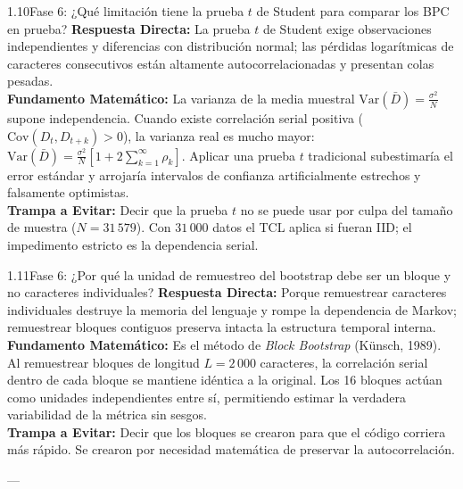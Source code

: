 \documentclass[11pt,letterpaper]{article}
\begin{document}
\begin{qbox}{1.10}{Fase 6: ¿Qué limitación tiene la prueba $t$ de Student para comparar los BPC en prueba?}
\textbf{Respuesta Directa:} La prueba $t$ de Student exige observaciones independientes y diferencias con distribución normal; las pérdidas logarítmicas de caracteres consecutivos están altamente autocorrelacionadas y presentan colas pesadas.\\[3pt]
\textbf{Fundamento Matemático:} La varianza de la media muestral $\text{Var}(\bar{D}) = \frac{\sigma^2}{N}$ supone independencia. Cuando existe correlación serial positiva ($\text{Cov}(D_t, D_{t+k}) > 0$), la varianza real es mucho mayor: $\text{Var}(\bar{D}) = \frac{\sigma^2}{N} \left[1 + 2\sum_{k=1}^\infty \rho_k\right]$. Aplicar una prueba $t$ tradicional subestimaría el error estándar y arrojaría intervalos de confianza artificialmente estrechos y falsamente optimistas.\\[3pt]
\textbf{Trampa a Evitar:} Decir que la prueba $t$ no se puede usar por culpa del tamaño de muestra ($N=31\,579$). Con $31\,000$ datos el TCL aplica si fueran IID; el impedimento estricto es la dependencia serial.
\end{qbox}

\begin{qbox}{1.11}{Fase 6: ¿Por qué la unidad de remuestreo del bootstrap debe ser un bloque y no caracteres individuales?}
\textbf{Respuesta Directa:} Porque remuestrear caracteres individuales destruye la memoria del lenguaje y rompe la dependencia de Markov; remuestrear bloques contiguos preserva intacta la estructura temporal interna.\\[3pt]
\textbf{Fundamento Matemático:} Es el método de \textit{Block Bootstrap} (Künsch, 1989). Al remuestrear bloques de longitud $L=2\,000$ caracteres, la correlación serial dentro de cada bloque se mantiene idéntica a la original. Los 16 bloques actúan como unidades independientes entre sí, permitiendo estimar la verdadera variabilidad de la métrica sin sesgos.\\[3pt]
\textbf{Trampa a Evitar:} Decir que los bloques se crearon para que el código corriera más rápido. Se crearon por necesidad matemática de preservar la autocorrelación.
\end{qbox}

---

\end{document}
